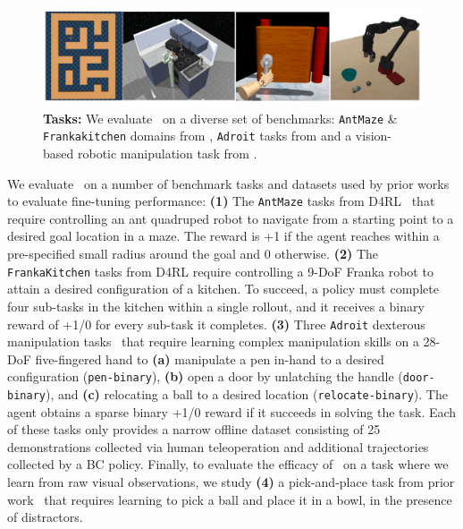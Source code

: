 \begin{figure}
\centering
\vspace{-0.6cm}
\includegraphics[width=0.97\linewidth]{chapters/cal_ql/figs-sample/envs_final.pdf}
\vspace{-0.4cm}
\caption{
\footnotesize{\textbf{Tasks:} We evaluate \methodname\ on a diverse set of benchmarks: \texttt{AntMaze} \& \texttt{Frankakitchen} domains from \cite{fu2020d4rl}, \texttt{Adroit} tasks from \cite{nair2020accelerating} and a vision-based robotic manipulation task from \cite{kumar2022pre}.}}
\label{fig:envs}
\vspace{-0.6cm}
\end{figure}
 We evaluate \methodname\ on a number of benchmark tasks and datasets used by prior works~\cite{kostrikov2021iql,nair2020accelerating} to evaluate fine-tuning performance: \textbf{(1)} The {\texttt{AntMaze}} tasks from D4RL~\cite{fu2020d4rl} that require controlling an ant quadruped robot to navigate from a starting point to a desired goal location in a maze. The reward is +1 if the agent reaches within a pre-specified small radius around the goal and 0 otherwise. 
\textbf{(2)} The \texttt{FrankaKitchen} tasks from D4RL require controlling a 9-DoF Franka robot to attain a desired configuration of a kitchen. To succeed, a policy 
must complete four sub-tasks in the kitchen within a single rollout, and it receives a binary reward of +1/0 for every sub-task it completes. \textbf{(3)} Three \texttt{Adroit} dexterous manipulation tasks~\cite{rajeswaran2018dapg,kostrikov2021iql,nair2020accelerating} that require learning complex manipulation skills on a 28-DoF five-fingered hand to \textbf{(a)} manipulate a pen in-hand to a desired configuration (\texttt{pen-binary}), \textbf{(b)} open a door by unlatching the handle (\texttt{door-binary}), and \textbf{(c)} relocating a ball to a desired location (\texttt{relocate-binary}). The agent obtains a sparse binary +1/0 reward if it succeeds in solving the task. Each of these tasks only provides a narrow offline dataset consisting of 25 demonstrations collected via human teleoperation and additional trajectories collected by a BC policy.
Finally, to evaluate the efficacy of \methodname\ on a task where we learn from raw visual observations, we study \textbf{(4)} a pick-and-place task from prior work~\cite{singh2020cog,kumar2022pre} that requires learning to pick a ball and place it in a bowl, in the presence of distractors.

